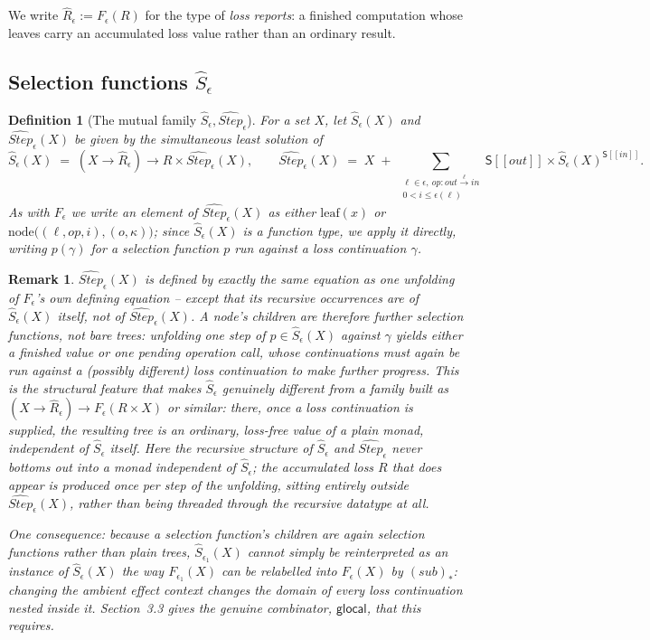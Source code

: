 \documentclass[11pt]{article}
\theoremstyle{plain}
\newtheorem{definition}[theorem]{Definition}
\newtheorem{remark}[theorem]{Remark}
\newcommand{\Ssem}[1]{\mathsf{S}[\![#1]\!]}
\newcommand{\Fm}[1]{F_{#1}}
\newcommand{\Rm}[1]{\widehat{R}_{#1}}
\newcommand{\Sm}[1]{\widehat{S}_{#1}}
\newcommand{\Stepm}[1]{\widehat{\mathit{Step}}_{#1}}
\newcommand{\eps}{\epsilon}
\newcommand{\op}{\mathit{op}}
\newcommand{\glocalOp}{\mathsf{glocal}}
\begin{document}
We write $\Rm\eps := \Fm\eps(R)$ for the type of \emph{loss reports}: a finished
computation whose leaves carry an accumulated loss value rather than an ordinary result.

\subsection{Selection functions $\Sm\eps$}

\begin{definition}[The mutual family $\Sm\eps,\Stepm\eps$]
For a set $X$, let $\Sm\eps(X)$ and $\Stepm\eps(X)$ be given by the simultaneous least
solution of
\[
  \Sm\eps(X) \;=\; (X\to\Rm\eps)\to R\times\Stepm\eps(X), \qquad
  \Stepm\eps(X) \;=\; X \;+\; \sum_{\substack{\ell\in\eps,\ \op:\mathit{out}\xrightarrow{\ell}\mathit{in}\\ 0<i\le\eps(\ell)}}
        \Ssem{\mathit{out}} \times \Sm\eps(X)^{\Ssem{\mathit{in}}}.
\]
As with $\Fm\eps$ we write an element of $\Stepm\eps(X)$ as either $\mathrm{leaf}(x)$ or
$\mathrm{node}\big((\ell,\op,i),(o,\kappa)\big)$; since $\Sm\eps(X)$ is a function type, we
apply it directly, writing $p(\gamma)$ for a selection function $p$ run against a loss
continuation $\gamma$.
\end{definition}

\begin{remark}
$\Stepm\eps(X)$ is defined by exactly the same equation as one unfolding of $\Fm\eps$'s
own defining equation -- except that its recursive occurrences are of $\Sm\eps(X)$ itself,
not of $\Stepm\eps(X)$. A node's children are therefore \emph{further selection
functions}, not bare trees: unfolding one step of $p\in\Sm\eps(X)$ against $\gamma$ yields
either a finished value or one pending operation call, whose continuations must again be
run against a (possibly different) loss continuation to make further progress. This is the
structural feature that makes $\Sm\eps$ genuinely different from a family built as
$(X\to\Rm\eps)\to \Fm\eps(R\times X)$ or similar: there, once a loss continuation is
supplied, the resulting tree is an ordinary, loss-free value of a plain monad, independent
of $\Sm\eps$ itself. Here the recursive structure of $\Sm\eps$ and $\Stepm\eps$ never
bottoms out into a monad independent of $\Sm\eps$; the accumulated loss $R$ that
\emph{does} appear is produced once per step of the unfolding, sitting entirely outside
$\Stepm\eps(X)$, rather than being threaded through the recursive datatype at all.

One consequence: because a selection function's children are again selection functions
rather than plain trees, $\Sm{\eps_1}(X)$ cannot simply be reinterpreted as an instance of
$\Sm\eps(X)$ the way $\Fm{\eps_1}(X)$ can be relabelled into $\Fm\eps(X)$ by
$(\mathit{sub})_*$: changing the ambient effect context changes the domain of every loss
continuation nested inside it. Section~3.3 gives the genuine combinator, $\glocalOp$, that
this requires.
\end{remark}
\end{document}
